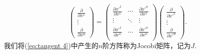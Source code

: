         \begin{equation}\label{eq:tangent 4}
            \begin{pmatrix}
                \frac{\partial}{\partial x^1}\\
                \vdots\\
                \frac{\partial}{\partial x^n}	
            \end{pmatrix}
            =
            \begin{pmatrix}
                \frac{\partial x'^1}{\partial x^1}&\cdots&\frac{\partial x'^n}{\partial x^1}\\
                \vdots&\ddots&\vdots\\
                \frac{\partial x'^1}{\partial x^n}&\cdots&\frac{\partial x'^n}{\partial x^n}\\	
            \end{pmatrix}
            \begin{pmatrix}
                \frac{\partial}{\partial x'^1}\\
                \vdots\\
                \frac{\partial}{\partial x'^n}	
            \end{pmatrix}.
        \end{equation}
        我们将(\ref{eq:tangent 4})中产生的$n$阶方阵称为Jocobi矩阵，记为$J$.
